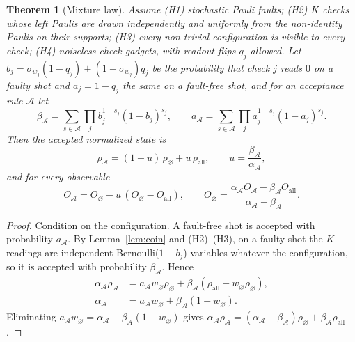 \documentclass[11pt,a4paper]{article}
\newtheorem{theorem}{Theorem}
\theoremstyle{remark}
\newcommand{\all}{\mathrm{all}}
\newcommand{\acc}{\mathcal{A}}
\begin{document}
\begin{theorem}[Mixture law]
\label{thm:mixture}
Assume (H1) stochastic Pauli faults; (H2) $K$ checks whose left Paulis are drawn independently and uniformly from the non-identity Paulis on their supports; (H3) every non-trivial configuration is visible to every check; (H4) noiseless check gadgets, with readout flips $q_j$ allowed. Let $b_j=\sigma_{w_j}(1-q_j)+(1-\sigma_{w_j})q_j$ be the probability that check $j$ reads $0$ on a faulty shot and $a_j=1-q_j$ the same on a fault-free shot, and for an acceptance rule $\acc$ let
\begin{equation}
\beta_\acc=\sum_{s\in\acc}\prod_j b_j^{1-s_j}(1-b_j)^{s_j},\qquad a_\acc=\sum_{s\in\acc}\prod_j a_j^{1-s_j}(1-a_j)^{s_j}.
\end{equation}
Then the accepted normalized state is
\begin{equation}
\rho_\acc=(1-u)\,\rho_\varnothing+u\,\rho_\all,\qquad u=\frac{\beta_\acc}{\alpha_\acc},
\label{eq:mixture}
\end{equation}
and for every observable
\begin{equation}
O_\acc=O_\varnothing-u\,(O_\varnothing-O_\all),\qquad
O_\varnothing=\frac{\alpha_\acc O_\acc-\beta_\acc O_\all}{\alpha_\acc-\beta_\acc}.
\label{eq:leak}
\end{equation}
\end{theorem}
\begin{proof}
Condition on the configuration. A fault-free shot is accepted with probability $a_\acc$. By Lemma~\ref{lem:coin} and (H2)--(H3), on a faulty shot the $K$ readings are independent Bernoulli($1-b_j$) variables whatever the configuration, so it is accepted with probability $\beta_\acc$. Hence
\begin{align}
\alpha_\acc\rho_\acc&=a_\acc w_\varnothing\rho_\varnothing+\beta_\acc(\rho_\all-w_\varnothing\rho_\varnothing),\\
\alpha_\acc&=a_\acc w_\varnothing+\beta_\acc(1-w_\varnothing).
\end{align}
Eliminating $a_\acc w_\varnothing=\alpha_\acc-\beta_\acc(1-w_\varnothing)$ gives $\alpha_\acc\rho_\acc=(\alpha_\acc-\beta_\acc)\rho_\varnothing+\beta_\acc\rho_\all$.
\end{proof}
\end{document}
